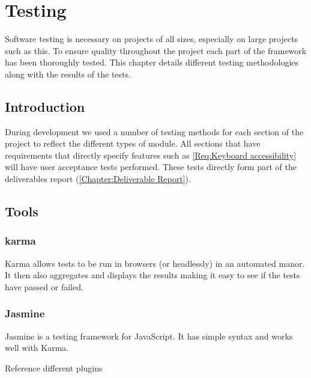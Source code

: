 
\chapter{Testing} \label{Chapter: Testing}

\begin{preamble}
Software testing is necessary on projects of all sizes, especially on large projects such as this. To ensure quality throughout the project each part of the framework has been thoroughly tested. This chapter details different testing methodologies along with the results of the tests.
\end{preamble}

\section{Introduction}

During development we used a number of testing methods for each section of the project to reflect the different types of module. All sections that have requirements that directly specify features such as \cref{Req:Keyboard accessibility} will have user acceptance tests performed. These tests directly form part of the deliverables report (\autoref{Chapter:Deliverable Report}).

\section{Tools}

\subsection{karma}

Karma allows tests to be run in browsers (or headlessly) in an automated manor.  It then also aggregates and displays the results making it easy to see if the tests have passed or failed.

\subsection{Jasmine}

Jasmine is a testing framework for JavaScript. It has simple syntax and works well with Karma.



Reference different plugins

